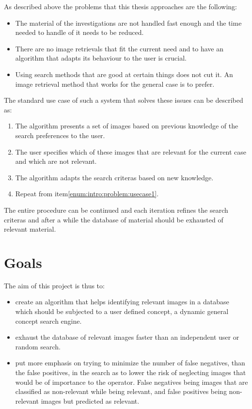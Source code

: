As described above the problems that this thesis approaches are the following:
\begin{itemize}
	\item The material of the investigations are not handled fast enough and the time needed to handle of it needs to be reduced.
	\item There are no image retrievals that fit the current need and to have an algorithm that adapts its behaviour to the user is crucial.
	\item Using search methods that are good at certain things does not cut it. An image retrieval method that works for the general case is to prefer.
\end{itemize}

The standard use case of such a system that solves these issues can be described as:
\begin{enumerate}
	\item \label{enum:intro:problem:usecase1} The algorithm presents a set of images based on previous knowledge of the search preferences to the user. 
	\item The user specifies which of these images that are relevant for the current case and which are not relevant. 
	\item The algorithm adapts the search criteras based on new knowledge.
	\item Repeat from item\ref{enum:intro:problem:usecase1}.
\end{enumerate}

The entire procedure can be continued and each iteration refines the search criteras and after a while the database of material should be exhausted of relevant material.
\section{Goals}
\label{sec:intro:goals}
The aim of this project is thus to:
\begin{itemize} 
	\item create an algorithm that helps identifying relevant images in a database which should be subjected to a user defined concept, a dynamic general concept search engine. 
	\item exhaust the database of relevant images faster than an independent user or random search. 
	\item put more emphasis on trying to minimize the number of false negatives, than the false positives, in the search as to lower the risk of neglecting images that would be of importance to the operator. False negatives being images that are classified as non-relevant while being relevant, and false positives being non-relevant images but predicted as relevant. 
\end{itemize}

